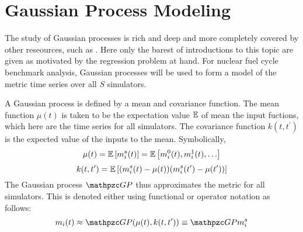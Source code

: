 \section{Gaussian Process Modeling}
\label{gp}
The study of Gaussian processes is rich and deep and more completely covered by 
other reseources, such as \cite{rasmussen2006gaussian}. Here only the barest of 
introductions to this topic are given as motivated by the regression problem at
hand. For nuclear fuel cycle benchmark analysis, Gaussian processes will be used
to form a model of the metric time series over all $S$ simulators. 

A Gaussian process is defined by a mean and covariance function. 
The mean function $\mu(t)$ is taken to be the expectation value $\mathbb{E}$ of mean
the input fuctions, which here are the time series for all simulators. The
covariance function $k(t, t^\prime)$ is the expected value of the inputs to the 
mean. Symbolically, 
\begin{equation}
\label{mean-func}
\mu(t) = \mathbb{E}\left[m_i^s(t)\right] = \mathbb{E}\left[m_i^0(t), m_i^1(t), \ldots\right]
\end{equation}
\begin{equation}
\label{covar-func}
k(t, t^\prime) = \mathbb{E}\left[(m_i^s(t) - \mu(t))(m_i^s(t^\prime) - \mu(t^\prime))\right]
\end{equation}
The Gaussian process $\GP$ thus approximates the metric for all simulators. This
is denoted either using functional or operator notation as follows:
\begin{equation}
\label{gp-def-approx}
m_i(t) \approx \GP(\mu(t), k(t, t^\prime)) \equiv \GP m_i^s
\end{equation}

